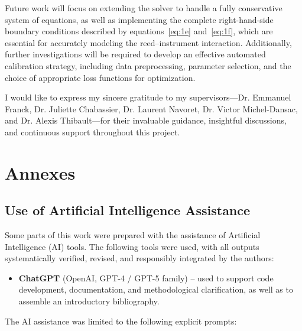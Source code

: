 \documentclass[11pt,a4paper]{report}
\theoremstyle{plain}
\theoremstyle{definition}
\begin{document}
Future work will focus on extending the solver to handle a fully conservative system of equations, 
as well as implementing the complete right-hand-side boundary conditions described by 
equations~\eqref{eq:1e} and~\eqref{eq:1f}, which are essential for accurately modeling the 
reed–instrument interaction. Additionally, further investigations will be required to develop 
an effective automated calibration strategy, including data preprocessing, parameter selection, 
and the choice of appropriate loss functions for optimization.

I would like to express my sincere gratitude to my supervisors—Dr. Emmanuel Franck, Dr. Juliette Chabassier, Dr. Laurent Navoret, Dr. Victor
 Michel-Dansac, and Dr. Alexis Thibault—for their invaluable guidance, insightful discussions, and continuous support throughout this project.


\newpage
\chapter{Annexes}
\section*{Use of Artificial Intelligence Assistance}

Some parts of this work were prepared with the assistance of Artificial Intelligence (AI) tools.  
The following tools were used, with all outputs systematically verified, revised, and responsibly integrated by the authors:

\begin{itemize}
    \item \textbf{ChatGPT} (OpenAI, GPT-4 / GPT-5 family) – used to support code development, documentation, and methodological clarification, as well as to assemble an introductory bibliography.
\end{itemize}

The AI assistance was limited to the following explicit prompts:
\end{document}
